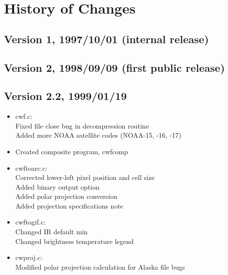 \chapter{History of Changes}
\label{history}

\section*{Version 1, 1997/10/01 (internal release)}

\section*{Version 2, 1998/09/09 (first public release)}




\section*{Version 2.2, 1999/01/19}

\begin{itemize}

  \item cwf.c:\\ 
  Fixed file close bug in decompression routine\\ 
  Added more NOAA satellite codes (NOAA-15, -16, -17) 

  \item Created composite program, cwfcomp

  \item cwftoarc.c:\\ 
  Corrected lower-left pixel position and cell size\\ 
  Added binary output option\\ 
  Added polar projection conversion\\ 
  Added projection specifications note 

  \item cwftogif.c:\\ 
  Changed IR default min\\ 
  Changed brightness temperature legend 

  \item cwproj.c:\\ 
  Modified polar projection calculation for Alaska file bugs\\ 

\end{itemize}


